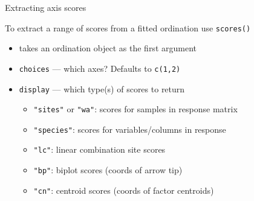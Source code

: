\documentclass[10pt,ignorenonframetext,compress, aspectratio=169]{beamer}
\begin{document}
\begin{frame}{Extracting axis scores}

To extract a range of scores from a fitted ordination use
\texttt{scores()}

\begin{itemize}
\itemsep1pt\parskip0pt
\item
  takes an ordination object as the first argument
\item
  \texttt{choices} --- which axes? Defaults to \texttt{c(1,2)}
\item
  \texttt{display} --- which type(s) of scores to return

  \begin{itemize}
  \itemsep1pt\parskip0pt
  \item
    \texttt{"sites"} or \texttt{"wa"}: scores for samples in response
    matrix
  \item
    \texttt{"species"}: scores for variables/columns in response
  \item
    \texttt{"lc"}: linear combination site scores
  \item
    \texttt{"bp"}: biplot scores (coords of arrow tip)
  \item
    \texttt{"cn"}: centroid scores (coords of factor centroids)
  \end{itemize}
\end{itemize}

\end{frame}
\end{document}
